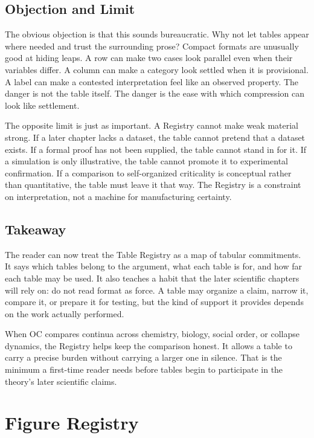 \documentclass[11pt,a4paper,openany]{book}
\begin{document}
\subsection{Objection and Limit}
The obvious objection is that this sounds bureaucratic. Why not let tables appear where needed and trust the surrounding prose? Compact formats are unusually good at hiding leaps. A row can make two cases look parallel even when their variables differ. A column can make a category look settled when it is provisional. A label can make a contested interpretation feel like an observed property. The danger is not the table itself. The danger is the ease with which compression can look like settlement. \cite{nicolis_prigogine_selforg,kauffman_autocatalytic}\par
The opposite limit is just as important. A Registry cannot make weak material strong. If a later chapter lacks a dataset, the table cannot pretend that a dataset exists. If a formal proof has not been supplied, the table cannot stand in for it. If a simulation is only illustrative, the table cannot promote it to experimental confirmation. If a comparison to self-organized criticality is conceptual rather than quantitative, the table must leave it that way. The Registry is a constraint on interpretation, not a machine for manufacturing certainty.\par
\subsection{Takeaway}
The reader can now treat the Table Registry as a map of tabular commitments. It says which tables belong to the argument, what each table is for, and how far each table may be used. It also teaches a habit that the later scientific chapters will rely on: do not read format as force. A table may organize a claim, narrow it, compare it, or prepare it for testing, but the kind of support it provides depends on the work actually performed. \cite{nicolis_prigogine_selforg,kauffman_autocatalytic}\par
When OC compares continua across chemistry, biology, social order, or collapse dynamics, the Registry helps keep the comparison honest. It allows a table to carry a precise burden without carrying a larger one in silence. That is the minimum a first-time reader needs before tables begin to participate in the theory's later scientific claims.\par
\section{Figure Registry}
\end{document}
